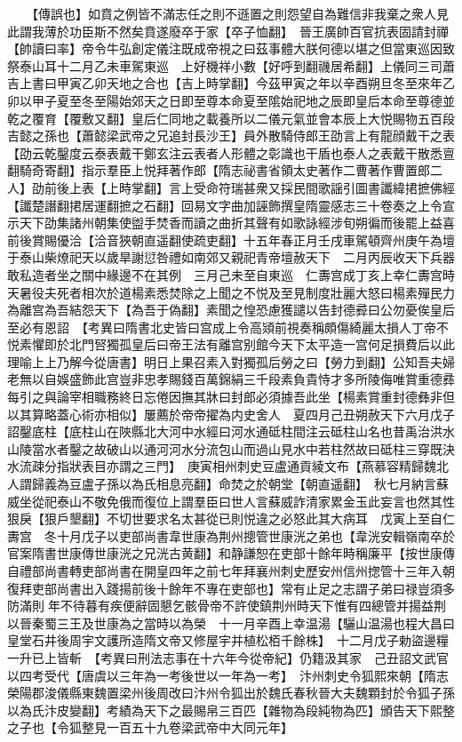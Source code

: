 　　【傳誤也】如賁之例皆不滿志任之則不遜置之則怨望自為難信非我棄之衆人見此謂我薄於功臣斯不然矣賁遂廢卒于家【卒子恤翻】　晉王廣帥百官抗表固請封禪【帥讀曰率】帝令牛弘創定儀注既成帝視之曰茲事體大朕何德以堪之但當東巡因致祭泰山耳十二月乙未車駕東巡　上好機祥小數【好呼到翻禨居希翻】上儀同三司蕭吉上書曰甲寅乙卯天地之合也【吉上時掌翻】今茲甲寅之年以辛酉朔旦冬至來年乙卯以甲子夏至冬至陽始郊天之日即至尊本命夏至隂始祀地之辰即皇后本命至尊德並乾之覆育【覆敷又翻】皇后仁同地之載養所以二儀元氣並會本辰上大悦賜物五百段吉懿之孫也【蕭懿梁武帝之兄追封長沙王】員外散騎侍郎王劭言上有龍顔戴干之表【劭云乾鑿度云泰表戴干鄭玄注云表者人形體之彰識也干盾也泰人之表戴干散悉亶翻騎奇寄翻】指示羣臣上悦拜著作郎【隋志祕書省領太史著作二曹著作曹置郎二人】劭前後上表【上時掌翻】言上受命符瑞甚衆又採民間歌謡引圖書讖緯捃摭佛經【讖楚譖翻捃居運翻摭之石翻】回易文字曲加誣飾撰皇隋靈感志三十卷奏之上令宣示天下劭集諸州朝集使盥手焚香而讀之曲折其聲有如歌詠經涉旬朔徧而後罷上益喜前後賞賜優洽【洽音狹朝直遥翻使疏吏翻】十五年春正月壬戌車駕頓齊州庚午為壇于泰山柴燎祀天以歲旱謝愆咎禮如南郊又親祀青帝壇赦天下　二月丙辰收天下兵器敢私造者坐之關中緣邊不在其例　三月己未至自東巡　仁夀宫成丁亥上幸仁夀宫時天暑役夫死者相次於道楊素悉焚除之上聞之不悦及至見制度壯麗大怒曰楊素殫民力為離宫為吾結怨天下【為吾于偽翻】素聞之惶恐慮獲譴以告封德彛曰公勿憂俟皇后至必有恩詔　【考異曰隋書北史皆曰宫成上令高熲前視奏稱頗傷綺麗太損人丁帝不悦素懼即於北門唘獨孤皇后曰帝王法有離宫别館今天下太平造一宫何足損費后以此理喻上上乃解今從唐書】明日上果召素入對獨孤后勞之曰【勞力到翻】公知吾夫婦老無以自娛盛飾此宫豈非忠孝賜錢百萬錦絹三千段素負貴恃才多所陵侮唯賞重德彞每引之與論宰相職務終日忘倦因撫其牀曰封郎必須據吾此坐【楊素賞重封德彝非但以其算略蓋心術亦相似】屢薦於帝帝擢為内史舍人　夏四月己丑朔赦天下六月戊子詔鑿底柱【底柱山在陜縣北大河中水經曰河水通砥柱間注云砥柱山名也昔禹治洪水山陵當水者鑿之故破山以通河河水分流包山而過山見水中若柱然故曰砥柱三穿既決水流疎分指狀表目亦謂之三門】　庚寅相州刺史豆盧通貢綾文布【燕慕容精歸魏北人謂歸義為豆盧子孫以為氏相息亮翻】命焚之於朝堂【朝直遥翻】　秋七月納言蘇威坐從祀泰山不敬免俄而復位上謂羣臣曰世人言蘇威詐清家累金玉此妄言也然其性狠戾【狠戶墾翻】不切世要求名太甚從已則悦違之必怒此其大病耳　戊寅上至自仁夀宫　冬十月戊子以吏部尚書韋世康為荆州摠管世康洸之弟也【韋洸安輯嶺南卒於官案隋書世康傳世康洸之兄洸古黄翻】和静謙恕在吏部十餘年時稱廉平【按世康傳自禮部尚書轉吏部尚書在開皇四年之前七年拜襄州刺史歷安州信州揔管十三年入朝復拜吏部尚書出入踐揚前後十餘年不專在吏部也】常有止足之志謂子弟曰禄豈須多防滿則年不待暮有疾便辭固懇乞骸骨帝不許使鎮荆州時天下惟有四總管并揚益荆以晉秦蜀三王及世康為之當時以為榮　十一月辛酉上幸温湯【驪山温湯也程大昌曰皇堂石井後周宇文護所造隋文帝又修屋宇并植松栢千餘株】　十二月戊子勅盜邊糧一升已上皆斬　【考異曰刑法志事在十六年今從帝紀】仍籍汲其家　己丑詔文武官以四考受代【唐虞以三年為一考後世以一年為一考】　汴州刺史令狐熙來朝【隋志榮陽郡浚儀縣東魏置梁州後周改曰汴州令狐出於魏氏春秋晉大夫魏顆封於令狐子孫以為氏汴皮變翻】考績為天下之最賜帛三百匹【雜物為段純物為匹】頒告天下熙整之子也【令狐整見一百五十九卷梁武帝中大同元年】

